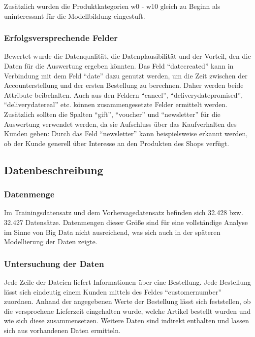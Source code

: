 \documentclass[a4paper,12pt]{article}
\begin{document}
Zusätzlich wurden die Produktkategorien w0 - w10 gleich zu Beginn als uninteressant für die Modellbildung eingestuft.


\subsubsection{Erfolgsversprechende Felder}
Bewertet wurde die Datenqualität, die Datenplausibilität und der
Vorteil, den die Daten für die Auswertung ergeben könnten. Das Feld "`datecreated"' kann in Verbindung
mit dem Feld "`date"' dazu genutzt werden, um die Zeit zwischen der Accounterstellung
und der ersten Bestellung zu berechnen. Daher werden beide Attribute beibehalten. Auch aus
den Feldern "`cancel"', "`deliverydatepromised"', "`deliverydatereal"'
etc. können zusammengesetzte Felder ermittelt werden.
Zusätzlich sollten die Spalten "`gift"', "`voucher"' und "`newsletter"' für die Auswertung verwendet werden, da sie Aufschluss über das Kaufverhalten des Kunden geben: Durch das Feld
"`newsletter"' kann beispielsweise erkannt werden, ob der Kunde generell über Interesse an den Produkten
des Shops verfügt. 

\subsection{Datenbeschreibung}

\subsubsection{Datenmenge}
Im Trainingsdatensatz und dem Vorhersagedatensatz befinden sich 32.428 bzw. 32.427 Datensätze.
Datenmengen dieser Größe sind für eine vollständige Analyse im Sinne von Big Data nicht
ausreichend, was sich auch in der späteren Modellierung der Daten zeigte.

\subsubsection{Untersuchung der Daten}

Jede Zeile der Dateien liefert Informationen über eine Bestellung. Jede Bestellung lässt sich eindeutig einem Kunden mittels des
Feldes "`customernumber"' zuordnen. Anhand der angegebenen Werte der Bestellung lässt sich
feststellen, ob die versprochene Lieferzeit eingehalten wurde, welche Artikel bestellt wurden
und wie sich diese zusammensetzen. Weitere Daten sind indirekt enthalten und lassen sich aus vorhandenen Daten ermitteln.
\end{document}
